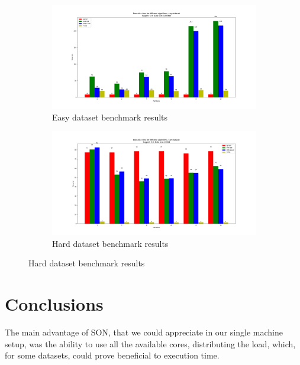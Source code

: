 \documentclass[a4paper]{article}
\begin{document}
	\begin{figure}[h]
		\centering
		\begin{subfigure}[b]{0.45\textwidth}
			\centering
			\includegraphics[width=\textwidth]{1_easy_0,9_1_partitions.png}
         	\caption{Easy dataset benchmark results}
         	\label{fig:1-09sup-1ds-par-e}
		\end{subfigure}
		\hfill		
		\begin{subfigure}[b]{0.45\textwidth}
			\centering
			\includegraphics[width=\textwidth]{1_hard_0,9_1_partitions.png}
         	\caption{Hard dataset benchmark results}
         	\label{fig:1-09sup-1ds-par-h}
		\end{subfigure}
		\hfill
		
	\end{figure}

	
	\section{Conclusions}
	The main advantage of SON, that we could appreciate in our single machine setup, was the ability to use all the available cores, distributing the load, which, for some datasets, could prove beneficial to execution time.\\
\end{document}
